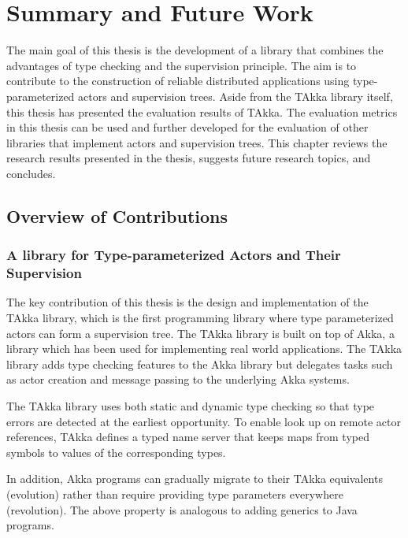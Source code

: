\chapter{Summary and Future Work}
\label{summary}

The main goal of this thesis is the development of a library that combines the 
advantages of type checking and the supervision principle.  The aim is to 
contribute to the construction of reliable distributed applications using 
type-parameterized actors and supervision trees.  Aside from the TAkka library 
itself, this thesis has presented the evaluation results of TAkka.  The 
evaluation metrics in this thesis can be used and further developed for the 
evaluation of other libraries that implement actors and supervision trees.  This 
chapter reviews the research results presented in the thesis, suggests future 
research topics, and concludes.


\section{Overview of Contributions}


\subsection{A library for Type-parameterized Actors and Their Supervision}

The key contribution of this thesis is the design and implementation of the 
TAkka library, which is the first programming library where type parameterized 
actors can form a supervision tree.  The TAkka library is built on top of Akka, 
a library which has been used for implementing real world applications.  The 
TAkka library adds type checking features to the Akka library but
delegates tasks such as actor creation and message passing to the underlying
Akka systems. 

The TAkka library uses both static and dynamic type checking so that type 
errors are detected at the earliest opportunity. To enable look up on remote 
actor references, TAkka defines a typed name server that keeps maps from typed 
symbols to values of the corresponding types.

In addition, Akka  programs can gradually migrate to their TAkka equivalents 
(evolution) rather than require providing type parameters everywhere 
(revolution).  The above property is analogous to adding generics to Java 
programs.

